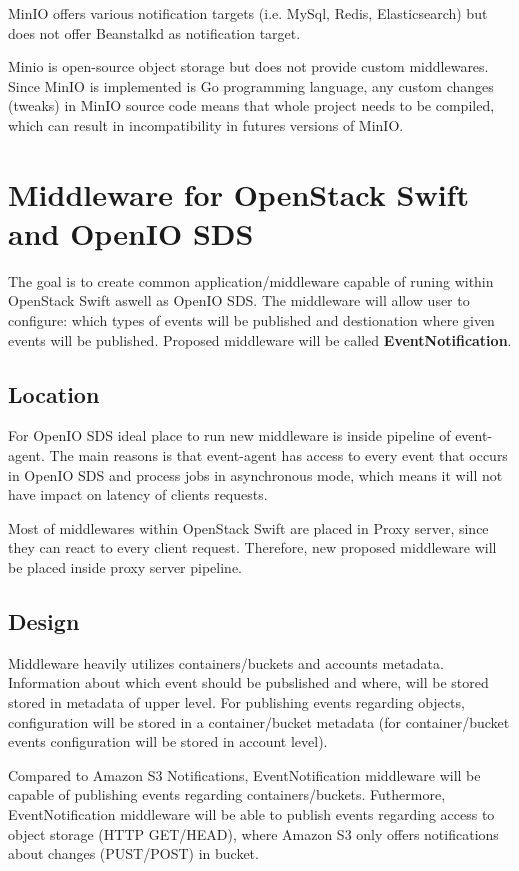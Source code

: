     MinIO offers various notification targets (i.e. MySql, Redis, Elasticsearch) but does not offer Beanstalkd as notification target.

    Minio is open-source object storage but does not provide custom middlewares. Since MinIO is implemented is Go programming language, any custom changes (tweaks) in MinIO source code means that whole project needs to be compiled, which can result in incompatibility in futures versions of MinIO.

\section{Middleware for OpenStack Swift and OpenIO SDS}
    The goal is to create common application/middleware capable of runing within OpenStack Swift aswell as OpenIO SDS. The middleware will allow user to configure: which types of events will be published and destionation where given events will be published. Proposed middleware will be called \textbf{EventNotification}.

    \subsection{Location}
    For OpenIO SDS ideal place to run new middleware is inside pipeline of event-agent. The main reasons is that event-agent has access to every event that occurs in OpenIO SDS and process jobs in asynchronous mode, which means it will not have impact on latency of clients requests.

    Most of middlewares within OpenStack Swift are placed in Proxy server, since they can react to every client request. Therefore, new proposed middleware will be placed inside proxy server pipeline.

    \subsection{Design}
    Middleware heavily utilizes containers/buckets and accounts metadata. Information about which event should be pubslished and where, will be stored stored in metadata of upper level. For publishing events regarding objects, configuration will be stored in a container/bucket metadata (for container/bucket events configuration will be stored in account level).

    Compared to Amazon S3 Notifications, EventNotification middleware will be capable of publishing events regarding containers/buckets. Futhermore, EventNotification middleware will be able to publish events regarding access to object storage (HTTP GET/HEAD), where Amazon S3 only offers notifications about changes (PUST/POST) in bucket.

